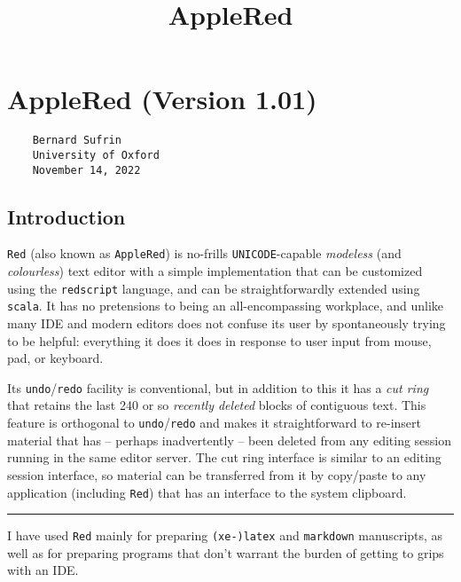 \documentclass[
]{article}
\title{AppleRed}
\author{}
\date{}
\begin{document}
\maketitle

\hypertarget{applered-version-1.01}{%
\section{AppleRed (Version 1.01)}\label{applered-version-1.01}}

\begin{verbatim}
    Bernard Sufrin
    University of Oxford
    November 14, 2022
\end{verbatim}

\hypertarget{introduction}{%
\subsection{Introduction}\label{introduction}}

\texttt{Red} (also known as \texttt{AppleRed}) is no-frills
\texttt{UNICODE}-capable \emph{modeless} (and \emph{colourless}) text
editor with a simple implementation that can be customized using the
\texttt{redscript} language, and can be straightforwardly extended using
\texttt{scala}. It has no pretensions to being an all-encompassing
workplace, and unlike many IDE and modern editors does not confuse its
user by spontaneously trying to be helpful: everything it does it does
in response to user input from mouse, pad, or keyboard.

Its \texttt{undo}/\texttt{redo} facility is conventional, but in
addition to this it has a \emph{cut ring} that retains the last 240 or
so \emph{recently deleted} blocks of contiguous text. This feature is
orthogonal to \texttt{undo}/\texttt{redo} and makes it straightforward
to re-insert material that has -- perhaps inadvertently -- been deleted
from any editing session running in the same editor server. The cut ring
interface is similar to an editing session interface, so material can be
transferred from it by copy/paste to any application (including
\texttt{Red}) that has an interface to the system clipboard.

\begin{center}\rule{0.5\linewidth}{0.5pt}\end{center}

I have used \texttt{Red} mainly for preparing \texttt{(xe-)latex} and
\texttt{markdown} manuscripts, as well as for preparing programs that
don't warrant the burden of getting to grips with an IDE.
\end{document}
